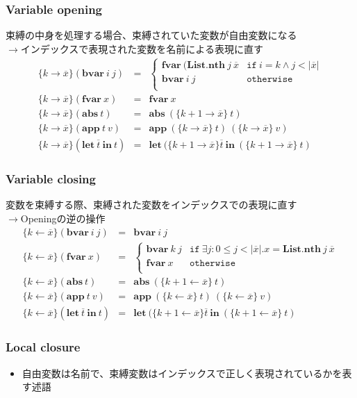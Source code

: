 \documentclass[dvipdfmx,cjk,xcolor=dvipsnames,envcountsect,notheorems,12pt]{beamer}
\theoremstyle{definition}
\newcommand{\keyword}[1]{\mathbf{#1}}
\newcommand{\LET}{\keyword{let}}
\newcommand{\IN}{\keyword{in}}
\newcommand{\BVAR}{\keyword{bvar}}
\newcommand{\FVAR}{\keyword{fvar}}
\newcommand{\ABS}{\keyword{abs}}
\newcommand{\APP}{\keyword{app}}
\begin{document}
\begin{frame}
	\frametitle{Variable opening}
	\Large 
	束縛の中身を処理する場合、束縛されていた変数が自由変数になる\\
	$\rightarrow$インデックスで表現された変数を名前による表現に直す
	\vfill
	{\footnotesize \begin{eqnarray*}
		\{k\rightarrow \overline{x}\}(\BVAR~i~j) & = &
			\begin{cases}
				\FVAR~(\keyword{List.nth}~j~\overline{x} & \texttt{if}~i=k \land j < |\overline{x}| \\
				\BVAR~i~j & \texttt{otherwise} \\
			\end{cases} \\
		\{k\rightarrow \overline{x}\}(\FVAR~x) & = & \FVAR~x \\
		\{k\rightarrow \overline{x}\}(\ABS~t) & = & \ABS~(\{k + 1\rightarrow \overline{x}\}~t) \\
		\{k\rightarrow \overline{x}\}(\APP~t~v) & = & \APP~(\{k\rightarrow \overline{x}\}~t)~(\{k\rightarrow \overline{x}\}~v) \\
		\{k\rightarrow \overline{x}\}(\LET~\overline{t}~\IN~t) & = & \LET~(\{k+1\rightarrow \overline{x}\}\overline{t}~\IN~(\{k+1\rightarrow \overline{x}\}~t)
	\end{eqnarray*}}
\end{frame}

\begin{frame}
	\frametitle{Variable closing}
	\Large 
	変数を束縛する際、束縛された変数をインデックスでの表現に直す\\
	$\rightarrow$Openingの逆の操作
	\vfill
	{\footnotesize \begin{eqnarray*}
		\{k\leftarrow \overline{x}\}(\BVAR~i~j) & = & \BVAR~i~j \\
		\{k\leftarrow \overline{x}\}(\FVAR~x) & = & 
			\begin{cases}
				\BVAR~k~j & \texttt{if}~\exists j:0\leq j < |\overline{x}|.x=\keyword{List.nth}~j~\overline{x} \\
				\FVAR~x & \texttt{otherwise} \\
			\end{cases} \\
		\{k\leftarrow \overline{x}\}(\ABS~t) & = & \ABS~(\{k + 1\leftarrow \overline{x}\}~t) \\
		\{k\leftarrow \overline{x}\}(\APP~t~v) & = & \APP~(\{k\leftarrow \overline{x}\}~t)~(\{k\leftarrow \overline{x}\}~v) \\
		\{k\leftarrow \overline{x}\}(\LET~\overline{t}~\IN~t) & = & \LET~(\{k+1\leftarrow \overline{x}\}\overline{t}~\IN~(\{k+1\leftarrow \overline{x}\}~t)
	\end{eqnarray*}}
\end{frame}

\begin{frame}
	\frametitle{Local closure}
	\Large
	\begin{itemize}
		\item 自由変数は名前で、束縛変数はインデックスで正しく表現されているかを表す述語
	\end{itemize}
\end{frame}
\end{document}
